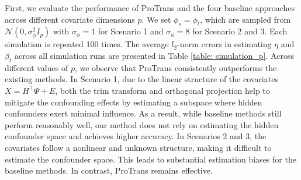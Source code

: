 \documentclass[12pt]{article}
\begin{document}
First, we evaluate the performance of ProTrans and the four baseline approaches across different covariate dimensions $p$. We set $\phi_s = \phi_t$, which are sampled from $\mathcal{N}(0,\sigma_\phi^2 I_p)$ with $\sigma_\phi = 1$ for Scenario 1 and $\sigma_\phi = 8$ for Scenario 2 and 3. Each simulation is repeated 100 times. The average $l_2$-norm errors in estimating $\eta$ and $\beta_t$ across all simulation runs are presented in Table \ref{table: simulation_p}. Across different values of $p$, we observe that ProTrans consistently outperforms the existing methods. In Scenario 1, due to the linear structure of the covariates $X = H^\top \Psi + E$, both the trim transform and orthogonal projection help to mitigate the confounding effects by estimating a subspace where hidden confounders exert minimal influence. As a result, while baseline methods still perform reasonably well,  our method does not rely on estimating the hidden confounder space and achieves higher accuracy. In Scenarios 2 and 3, the covariates follow a nonlinear and unknown structure, making it difficult to estimate the confounder space. This leads to substantial estimation biases for the baseline methods. In contrast, ProTrans remains effective.
\end{document}
